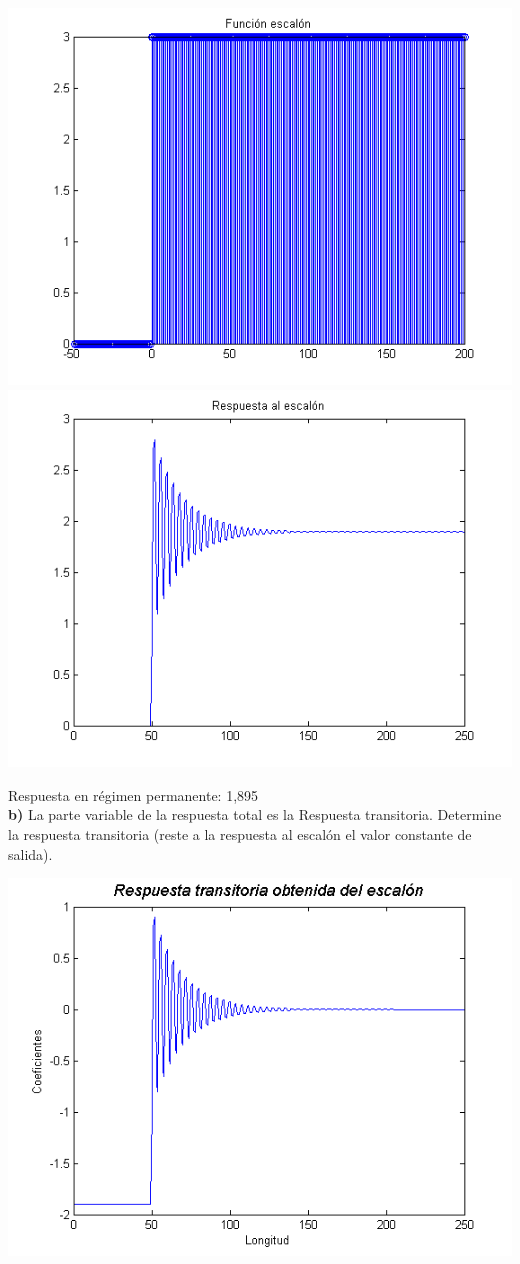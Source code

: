 \documentclass[a4paper,12pt]{article}
\begin{document}
\begin{center}
\includegraphics[width=.8 \textwidth]{funcion-escalon-ejercicio-2.png}\\
\includegraphics[width=.8 \textwidth]{respuesta-impulso-funcion-escalon-ejercicio-2.png}
\end{center}

Respuesta en régimen permanente: 1,895\\

\textbf{b)} La parte variable de la respuesta total es la Respuesta transitoria. Determine la respuesta transitoria (reste a la respuesta al escalón el valor constante de salida). \\

\begin{center}
\includegraphics[width=.8 \textwidth]{respuesta-transitoria-al-escalon-ejercicio-2.png}
\end{center}
\end{document}
